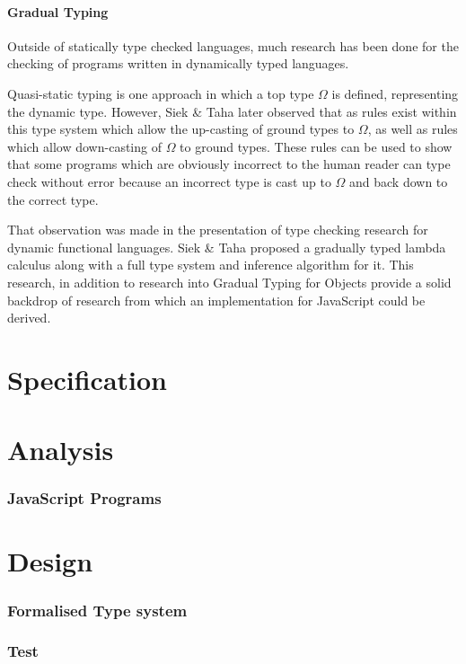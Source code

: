 \documentclass[british, twoside]{bhamthesis}
\theoremstyle{definition}
\begin{document}
    \subsubsection{Gradual Typing}
      Outside of statically type checked languages, much research has been done for the checking of programs written in dynamically typed languages.

      Quasi-static typing\autocite{Thatte1989} is one approach in which a top type $\Omega$ is defined, representing the dynamic type. However, Siek \& Taha later observed that as rules exist within this type system which allow the up-casting of ground types to $\Omega$, as well as rules which allow down-casting of $\Omega$ to ground types. These rules can be used to show that some programs which are obviously incorrect to the human reader can type check without error because an incorrect type is cast up to $\Omega$ and back down to the correct type\autocite{Siek2006}.

      That observation was made in the presentation of type checking research for dynamic functional languages. Siek \& Taha proposed a gradually typed lambda calculus along with a full type system and inference algorithm for it\autocite{Siek2006}. This research, in addition to research into Gradual Typing for Objects\autocite{Siek2007} provide a solid backdrop of research from which an implementation for JavaScript could be derived.


\chapter{Specification}

\chapter{Analysis}

  \subsection{JavaScript Programs}

\chapter{Design}

  \subsection{Formalised Type system}


  \subsection{Test}

\printbibliography
\end{document}

